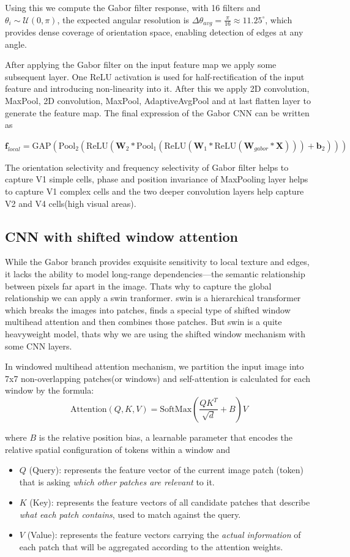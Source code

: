 \documentclass[preprint,12pt]{elsarticle}
\begin{document}
Using this we compute the Gabor filter response, with 16 filters and $\theta_i \sim \mathcal{U}(0, \pi)$, the expected angular resolution is
$\Delta \theta_{avg} = \frac{\pi}{16} \approx 11.25^\circ$, which provides dense coverage of orientation space, enabling detection of edges at any angle.

After applying the Gabor filter on the input feature map we apply some subsequent layer. One ReLU activation is used for half-rectification of the input feature and introducing non-linearity into it. After this we apply 2D convolution, MaxPool, 2D convolution, MaxPool, AdaptiveAvgPool and at last flatten layer to generate the feature map. The final expression of the Gabor CNN can be written as

$\mathbf{f}_{local}
= \mathrm{GAP}(\mathrm{Pool}_2(\mathrm{ReLU}(\mathbf{W}_2 * \mathrm{Pool}_1(\mathrm{ReLU}(\mathbf{W}_1 * \mathrm{ReLU}(\mathbf{W}_{gabor} * \mathbf{X}))) + \mathbf{b}_2)))$

The orientation selectivity and frequency selectivity of Gabor filter helps to capture V1 simple cells, phase and position invariance of MaxPooling layer helps to capture V1 complex cells and the two deeper convolution layers help capture V2 and V4 cells(high visual areas).


\FloatBarrier
\subsection{CNN with shifted window attention}

While the Gabor branch provides exquisite sensitivity to local texture and edges, it lacks the ability to model long-range dependencies—the semantic relationship between pixels far apart in the image. Thats why to capture the global relationship we can apply a swin tranformer. swin is a hierarchical transformer which breaks the images into patches, finds a special type of shifted window multihead attention and then combines those patches. But swin is a quite heavyweight model, thats why we are using the shifted window mechanism with some CNN layers. 

In windowed multihead attention mechanism, we partition the input image into 7x7 non-overlapping patches(or windows) and self-attention is calculated for each window by the formula:
\[
\text{Attention}(Q, K, V) 
= \text{SoftMax}\left(\frac{QK^{T}}{\sqrt{d}} + B \right) V
\]

where $B$ is the relative position bias, a learnable parameter that encodes the relative spatial configuration of tokens within a window and
\begin{itemize}
\item $Q$ (Query): represents the feature vector of the current image patch (token) that is asking \emph{which other patches are relevant} to it.
\item $K$ (Key): represents the feature vectors of all candidate patches that describe \emph{what each patch contains}, used to match against the query.
\item $V$ (Value): represents the feature vectors carrying the \emph{actual information} of each patch that will be aggregated according to the attention weights.
\end{itemize}
\end{document}

